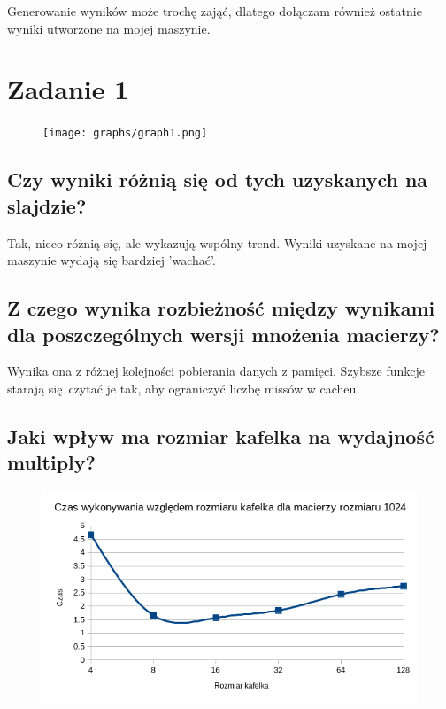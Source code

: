 \documentclass[a4paper,12pt]{mwart} %
\begin{document}
Generowanie wyników może trochę zająć, dlatego dołączam również ostatnie wyniki utworzone na mojej maszynie.
\section*{Zadanie 1}

\begin{figure}[h!]
  \texttt{[image: graphs/graph1.png]}
\end{figure}

\subsection*{Czy wyniki różnią się od tych uzyskanych na slajdzie?}

Tak, nieco różnią się, ale wykazują wspólny trend. Wyniki uzyskane na mojej maszynie wydają się bardziej 'wachać'.

\subsection*{Z czego wynika rozbieżność między wynikami dla poszczególnych wersji mnożenia macierzy?}

Wynika ona z różnej kolejności pobierania danych z pamięci. Szybsze funkcje starają się czytać je tak, aby ograniczyć liczbę missów w cacheu.


\subsection*{Jaki wpływ ma rozmiar kafelka na wydajność multiply?}

\begin{figure}[h!]
  \includegraphics[width=\linewidth]{graphs/graph1-2.png}
\end{figure}
\end{document}
